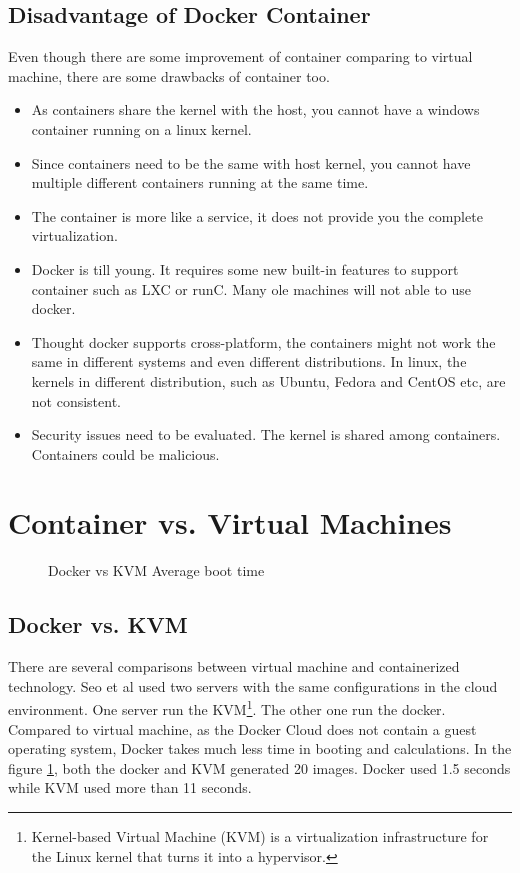 \documentclass{sig-alternate}
\begin{document}
\subsection{Disadvantage of Docker Container}
Even though there are some improvement of container comparing to virtual machine, there are some drawbacks of container too. 
\begin{itemize}
\item As containers share the kernel with the host, you cannot have a windows container running on a linux kernel.
\item Since containers need to be the same with host kernel, you cannot have multiple different containers running at the same time. 
\item The container is more like a service, it does not provide you the complete virtualization.
\item Docker is till young. It requires some new built-in features to support container such as LXC or runC. Many ole machines will not able to use docker.
\item Thought docker supports cross-platform, the containers might not work the same in different systems and even different distributions. In linux, the kernels in different distribution, such as Ubuntu, Fedora and CentOS etc, are not consistent.
\item Security issues need to be evaluated. The kernel is shared among containers. Containers could be malicious. 
\end{itemize}

\section{Container vs. Virtual Machines}

\begin{figure}[htb]
\centering
{}
\caption{Docker vs KVM Average boot time\cite{vdcp:seo}}
\label{fig:docker_kvm}
\vskip -6pt
\end{figure}

\subsection{Docker vs. KVM}

There are several comparisons between virtual machine and containerized technology. Seo et al\cite{vdcp:seo} used two servers with the same configurations in the cloud environment. One server run the KVM\footnote{Kernel-based Virtual Machine (KVM) is a virtualization infrastructure for the Linux kernel that turns it into a hypervisor.}. The other one run the docker. Compared to virtual machine, as the Docker Cloud does not contain a guest operating system, Docker takes much less time in booting and calculations. In the figure \ref{fig:docker_kvm}, both the docker and KVM generated 20 images. Docker used 1.5 seconds while KVM used more than 11 seconds. 
\end{document}
